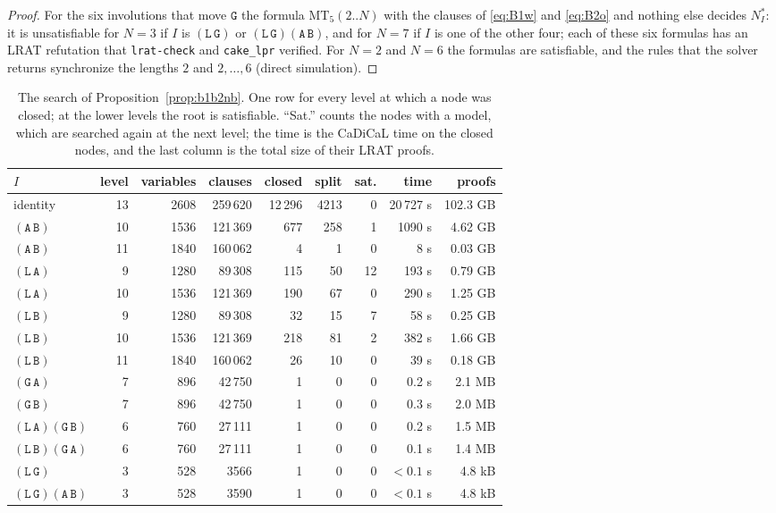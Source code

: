 \documentclass[11pt]{article}
\theoremstyle{remark}
\newcommand{\Lq}{\mathtt{L}}\newcommand{\Gq}{\mathtt{G}}\newcommand{\Aq}{\mathtt{A}}\newcommand{\Bq}{\mathtt{B}}\newcommand{\Fq}{\mathtt{F}}
\newcommand{\MT}{\mathrm{MT}}
\begin{document}
\begin{proof}
For the six involutions that move $\Gq$ the formula $\MT_5(2..N)$ with the clauses of \eqref{eq:B1w} and
\eqref{eq:B2o} and nothing else decides $N^\ast_I$: it is unsatisfiable for $N=3$ if $I$ is $(\Lq\,\Gq)$ or
$(\Lq\,\Gq)(\Aq\,\Bq)$, and for $N=7$ if $I$ is one of the other four; each of these six formulas has an LRAT
refutation that \texttt{lrat-check} and \texttt{cake\_lpr} verified. For $N=2$ and $N=6$ the formulas are
satisfiable, and the rules that the solver returns synchronize the lengths $2$ and $2,\dots,6$ (direct
simulation).
\end{proof}

\begin{table}[ht]
\centering\small
\caption{The search of Proposition~\ref{prop:b1b2nb}. One row for every level at which a node was closed; at
the lower levels the root is satisfiable. ``Sat.'' counts the nodes with a model, which are searched again
at the next level; the time is the CaDiCaL time on the closed nodes, and the last column is the total size
of their LRAT proofs.}\label{tab:b1b2nb}
\begin{tabular}{lrrrrrrrr}
\toprule
$I$ & level & variables & clauses & closed & split & sat. & time & proofs\\
\midrule
identity & 13 & 2608 & 259\,620 & 12\,296 & 4213 & 0 & 20\,727 s & 102.3 GB\\
$(\Aq\,\Bq)$ & 10 & 1536 & 121\,369 & 677 & 258 & 1 & 1090 s & 4.62 GB\\
$(\Aq\,\Bq)$ & 11 & 1840 & 160\,062 & 4 & 1 & 0 & 8 s & 0.03 GB\\
$(\Lq\,\Aq)$ & 9 & 1280 & 89\,308 & 115 & 50 & 12 & 193 s & 0.79 GB\\
$(\Lq\,\Aq)$ & 10 & 1536 & 121\,369 & 190 & 67 & 0 & 290 s & 1.25 GB\\
$(\Lq\,\Bq)$ & 9 & 1280 & 89\,308 & 32 & 15 & 7 & 58 s & 0.25 GB\\
$(\Lq\,\Bq)$ & 10 & 1536 & 121\,369 & 218 & 81 & 2 & 382 s & 1.66 GB\\
$(\Lq\,\Bq)$ & 11 & 1840 & 160\,062 & 26 & 10 & 0 & 39 s & 0.18 GB\\
$(\Gq\,\Aq)$ & 7 & 896 & 42\,750 & 1 & 0 & 0 & 0.2 s & 2.1 MB\\
$(\Gq\,\Bq)$ & 7 & 896 & 42\,750 & 1 & 0 & 0 & 0.3 s & 2.0 MB\\
$(\Lq\,\Aq)(\Gq\,\Bq)$ & 6 & 760 & 27\,111 & 1 & 0 & 0 & 0.2 s & 1.5 MB\\
$(\Lq\,\Bq)(\Gq\,\Aq)$ & 6 & 760 & 27\,111 & 1 & 0 & 0 & 0.1 s & 1.4 MB\\
$(\Lq\,\Gq)$ & 3 & 528 & 3566 & 1 & 0 & 0 & $<0.1$ s & 4.8 kB\\
$(\Lq\,\Gq)(\Aq\,\Bq)$ & 3 & 528 & 3590 & 1 & 0 & 0 & $<0.1$ s & 4.8 kB\\
\bottomrule
\end{tabular}
\end{table}
\end{document}
